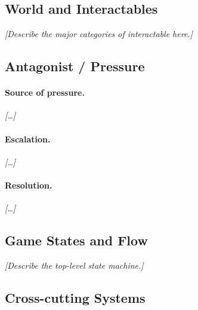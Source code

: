 \subsection{World and Interactables}


\textit{[Describe the major categories of interactable here.]}

\subsection{Antagonist / Pressure}


\paragraph{Source of pressure.}
\textit{[\ldots]}

\paragraph{Escalation.}
\textit{[\ldots]}

\paragraph{Resolution.}
\textit{[\ldots]}

\subsection{Game States and Flow}


\textit{[Describe the top-level state machine.]}

\subsection{Cross-cutting Systems}

